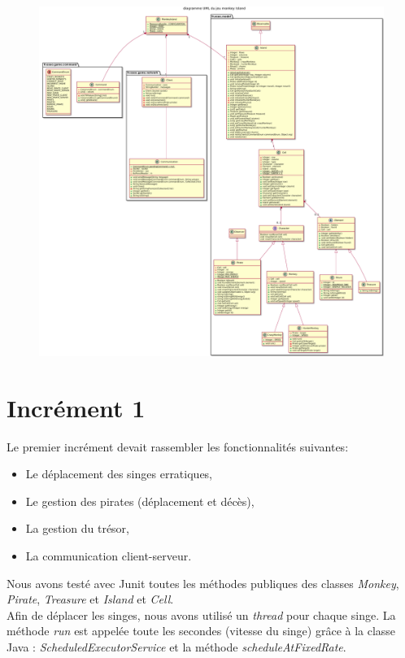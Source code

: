 \begin{figure}[!ht]
	\centering
	\includegraphics[width=\textwidth]{images/plantuml.pdf}
\end{figure}


\clearpage
\section{Incrément 1}
Le premier incrément devait rassembler les fonctionnalités suivantes:
\begin{itemize}
\item Le déplacement des singes erratiques,
\item Le gestion des pirates (déplacement et décès),
\item La gestion du trésor,
\item La communication client-serveur.\\
\end{itemize}

Nous avons testé avec Junit toutes les méthodes publiques des classes \emph{Monkey}, \emph{Pirate}, \emph{Treasure} et \emph{Island} et \emph{Cell}.\\

Afin de déplacer les singes, nous avons utilisé un \emph{thread} pour chaque singe. La méthode \emph{run} est appelée toute les secondes (vitesse du singe) grâce à la classe Java : \emph{ScheduledExecutorService} et la méthode  \emph{scheduleAtFixedRate}.

